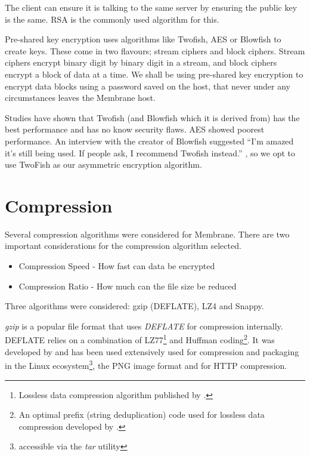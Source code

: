 \documentclass[11pt, a4paper, twoside]{report}
\begin{document}
The client can ensure it is talking to the same server by ensuring the public key is the same. RSA is the commonly used algorithm for this.

Pre-shared key encryption uses algorithms like Twofish, AES or Blowfish to create keys. These come in two flavours; stream ciphers and block ciphers. Stream ciphers encrypt binary digit by binary digit in a stream, and block ciphers encrypt a block of data at a time. We shall be using pre-shared key encryption to encrypt data blocks using a password saved on the host, that never under any circumstances leaves the Membrane host.

Studies have shown that Twofish (and Blowfish which it is derived from) has the best performance and has no know security flaws. AES showed poorest performance. \citep*{thakur2011aes, rizvi2011performance, mushtaque2014evaluation} An interview with the creator of Blowfish suggested ``I'm amazed it's still being used. If people ask, I recommend Twofish instead.'' \cite{fish2007bruce}, so we opt to use TwoFish as our asymmetric encryption algorithm.

\section{Compression} \label{sec:compression}

Several compression algorithms were considered for Membrane. There are two important considerations for the compression algorithm selected.

\begin{itemize}
 \item Compression Speed - How fast can data be encrypted
 \item Compression Ratio - How much can the file size be reduced
\end{itemize}

Three algorithms were considered: gzip (DEFLATE), LZ4 and Snappy.

\emph{gzip} is a popular file format that uses \emph{DEFLATE} for compression internally. DEFLATE relies on a combination of LZ77\footnote{Lossless data compression algorithm published by \cite{ziv1977universal}.} and Huffman coding\footnote{An optimal prefix (string deduplication) code used for lossless data compression developed by \cite{huffman1952method}.}. It was developed by \cite{deutsch1996deflate} and has been used extensively used for compression and packaging in the Linux ecosystem\footnote{accessible via the \emph{tar} utility}, the PNG image format and for HTTP compression.
\end{document}
